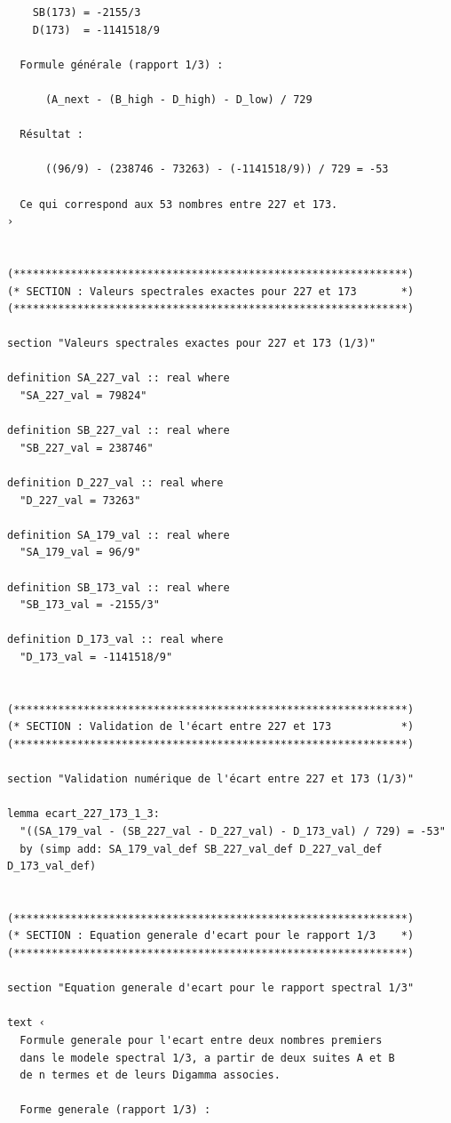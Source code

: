 \documentclass[a4paper,11pt]{article}
\begin{document}
\begin{holcode}[title={\textcolor{white}{Fichier : methode\_spectral.thy -- Partie 1/4}}]
\begin{lstlisting}
    SB(173) = -2155/3
    D(173)  = -1141518/9

  Formule générale (rapport 1/3) :

      (A_next - (B_high - D_high) - D_low) / 729

  Résultat :

      ((96/9) - (238746 - 73263) - (-1141518/9)) / 729 = -53

  Ce qui correspond aux 53 nombres entre 227 et 173.
›


(**************************************************************)
(* SECTION : Valeurs spectrales exactes pour 227 et 173       *)
(**************************************************************)

section "Valeurs spectrales exactes pour 227 et 173 (1/3)"

definition SA_227_val :: real where
  "SA_227_val = 79824"

definition SB_227_val :: real where
  "SB_227_val = 238746"

definition D_227_val :: real where
  "D_227_val = 73263"

definition SA_179_val :: real where
  "SA_179_val = 96/9"

definition SB_173_val :: real where
  "SB_173_val = -2155/3"

definition D_173_val :: real where
  "D_173_val = -1141518/9"


(**************************************************************)
(* SECTION : Validation de l'écart entre 227 et 173           *)
(**************************************************************)

section "Validation numérique de l'écart entre 227 et 173 (1/3)"

lemma ecart_227_173_1_3:
  "((SA_179_val - (SB_227_val - D_227_val) - D_173_val) / 729) = -53"
  by (simp add: SA_179_val_def SB_227_val_def D_227_val_def D_173_val_def)


(**************************************************************)
(* SECTION : Equation generale d'ecart pour le rapport 1/3    *)
(**************************************************************)

section "Equation generale d'ecart pour le rapport spectral 1/3"

text ‹
  Formule generale pour l'ecart entre deux nombres premiers
  dans le modele spectral 1/3, a partir de deux suites A et B
  de n termes et de leurs Digamma associes.

  Forme generale (rapport 1/3) :


\end{lstlisting}
\end{holcode}
\end{document}

